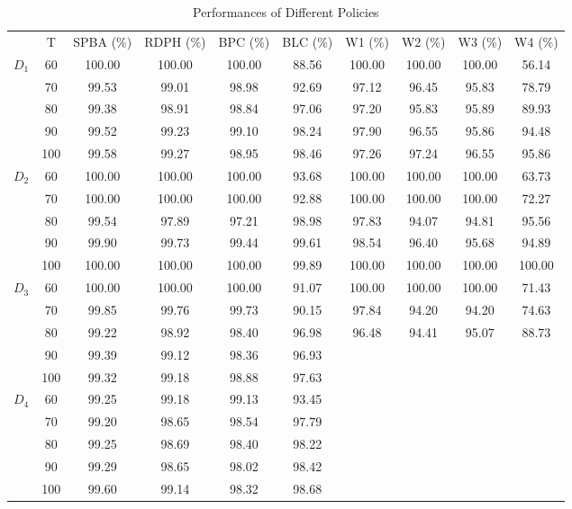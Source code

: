   \begin{table}[h]
   \centering
   \caption{Performances of Different Policies}\label{tab_perf}
   \begin{tabular}{cccccccccc}
   \hline
    & T & SPBA (\%) & RDPH (\%) & BPC (\%) & BLC (\%) & W1 (\%) & W2 (\%) & W3 (\%) & W4 (\%) \\
   \cmidrule(r){0-1} \cmidrule(lr){3-6} \cmidrule(lr){7-10} 
   \multirow{5}{*}{$D_1$} & 60 & 100.00 & 100.00 & 100.00 & 88.56 & 100.00 & 100.00 & 100.00 & 56.14  \\
   & 70    & 99.53 & 99.01 & 98.98 & 92.69  & 97.12 & 96.45 & 95.83 & 78.79 \\
   & 80    & 99.38 & 98.91 & 98.84 & 97.06  & 97.20 & 95.83 & 95.89 & 89.93 \\
   & 90    & 99.52 & 99.23 & 99.10 & 98.24  & 97.90 & 96.55 & 95.86 & 94.48 \\
   & 100   & 99.58 & 99.27 & 98.95 & 98.46  & 97.26 & 97.24 & 96.55 & 95.86 \\
   \hline
   \multirow{5}{*}{$D_2$} & 60  & 100.00 & 100.00 & 100.00 & 93.68 & 100.00 & 100.00 & 100.00 & 63.73  \\
      & 70  & 100.00 & 100.00 & 100.00 & 92.88 & 100.00 & 100.00 & 100.00 & 72.27 \\
      & 80  & 99.54 & 97.89 & 97.21 & 98.98 & 97.83 & 94.07 & 94.81 & 95.56 \\
      & 90  & 99.90 & 99.73 & 99.44 & 99.61 & 98.54 & 96.40 & 95.68 & 94.89 \\
      & 100 & 100.00 & 100.00 & 100.00 & 99.89 & 100.00 & 100.00 & 100.00 & 100.00 \\ 
   \hline
   \multirow{5}{*}{$D_3$} & 60  & 100.00 & 100.00 & 100.00 & 91.07 & 100.00 & 100.00 & 100.00 & 71.43  \\
   & 70  & 99.85 & 99.76 & 99.73 & 90.15 & 97.84 & 94.20 & 94.20 & 74.63 \\
   & 80  & 99.22 & 98.92 & 98.40 & 96.98 & 96.48 & 94.41 & 95.07 & 88.73 \\
   & 90  & 99.39 & 99.12 & 98.36 & 96.93 &  \\
   & 100  & 99.32 & 99.18 & 98.88 & 97.63  \\
     \hline
     \multirow{5}{*}{$D_4$} & 60  & 99.25 & 99.18 & 99.13 & 93.45  \\
      & 70  & 99.20 & 98.65 & 98.54 & 97.79  \\
      & 80  & 99.25 & 98.69 & 98.40 & 98.22 \\
      & 90  & 99.29 & 98.65 & 98.02 & 98.42  \\
      & 100 & 99.60 & 99.14 & 98.32 & 98.68 \\
   \hline
   \end{tabular}
 \end{table}


